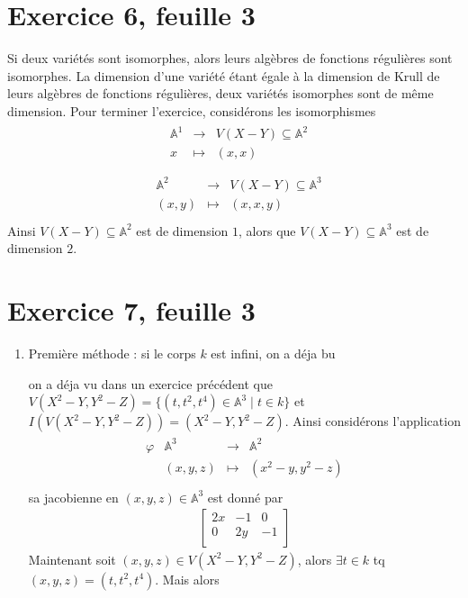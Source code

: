 \documentclass[11pt]{article}
\begin{document}
\section*{Exercice 6, feuille 3}
    Si deux variétés sont isomorphes, alors leurs algèbres de fonctions régulières sont isomorphes. La dimension d'une variété étant égale à la dimension de Krull de leurs algèbres de fonctions régulières, deux variétés isomorphes sont de même dimension. Pour terminer l'exercice, considérons les isomorphismes
    \begin{align*}
        \begin{array}{cccc}
            & \mathbb{A}^1 & \to & V(X - Y) \subseteq \mathbb{A}^2 \\
            & x & \mapsto & (x, x) \\
        \end{array}
    \end{align*}
    \begin{align*}
        \begin{array}{cccc}
            & \mathbb{A}^2 & \to & V(X - Y) \subseteq \mathbb{A}^3 \\
            & (x,y) & \mapsto & (x, x, y) \\
        \end{array}
    \end{align*}
    Ainsi $V(X - Y) \subseteq \mathbb{A}^2$ est de dimension $1$, alors que $V(X - Y) \subseteq \mathbb{A}^3$ est de dimension $2$.

\section*{Exercice 7, feuille 3}

    \begin{enumerate}
        \item Première méthode : si le corps $k$ est infini, on a déja bu
        
        
        on a déja vu dans un exercice précédent que $V(X^2 - Y, Y^2 - Z) = \{(t,t^2,t^4) \in \mathbb{A}^3 \mid t \in k\}$ et $I(V(X^2 - Y, Y^2 - Z)) = (X^2 - Y, Y^2 - Z)$. Ainsi considérons l'application
        \begin{align*}
            \begin{array}{cccc}
                \varphi & \mathbb{A}^3 & \to & \mathbb{A}^2 \\
                & (x,y,z) & \mapsto & (x^2 - y, y^2 - z) \\
            \end{array}
        \end{align*}
        sa jacobienne en $(x,y,z) \in \mathbb{A}^3$ est donné par
        \begin{align*}
            \begin{bmatrix}
                2x & -1 & 0 \\
                0 & 2y & -1 \\
            \end{bmatrix}
        \end{align*}
        Maintenant soit $(x,y,z) \in V(X^2 - Y, Y^2 - Z)$, alors $\exists t \in k$ tq $(x,y,z) = (t, t^2, t^4)$. Mais alors
        
    \end{enumerate}
\end{document}
